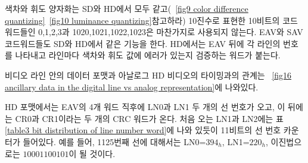색차와 휘도 양자화는 SD와 HD에서 모두 같고(\figurename~\ref{fig9 color difference quantizing}\와 \figurename~\ref{fig10 luminance quantizing}\을 참고하라) 10진수로 표현한 10비트의 코드워드들인 0,1,2,3과 1020,1021,1022,1023은 마찬가지로 사용되지 않는다.
EAV와 SAV 코드워드들도 SD와 HD에서 같은 기능을 한다. HD에서는 EAV 뒤에 각 라인의 번호를 나타내고 라인마다 색차와 휘도 값에 에러가 있는지 검증하는 워드가 붙는다.

비디오 라인 안의 데이터 포맷과 아날로그 HD 비디오의 타이밍과의 관계는 \figurename~\ref{fig16 ancillary data in the digital line vs analog representation}에 나와있다.

HD 포맷에서는 EAV의 4개 워드 직후에 LN0과 LN1 두 개의 선 번호가 오고, 이 뒤에는 CR0과 CR1이라는 두 개의 CRC 워드가 온다. 처음 오는 LN1과 LN2에는 표 \ref{table3 bit distribution of line number word}에 나와 있듯이 11비트의 선 번호 카운터가 들어있다.
예를 들어, 1125번째 선에 대해서는 LN0=$394_h$, LN1=$220_h$, 이진법으로는 $10001100101$이 될 것이다.